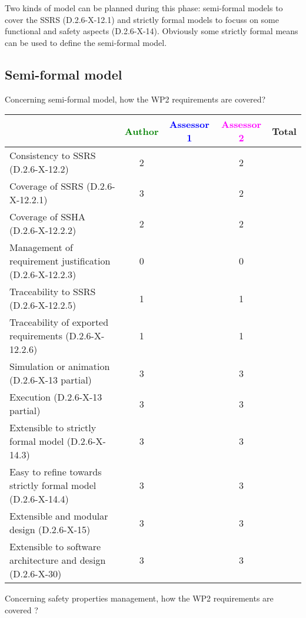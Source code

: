 Two kinds of model can be planned during this phase: semi-formal models to  cover the SSRS (D.2.6-X-12.1) and strictly formal  models to  focuss on some functional and safety aspects (D.2.6-X-14).  Obviously some strictly  formal means can be used to define the semi-formal  model.

\subsection{Semi-formal model}

Concerning semi-formal model, how the WP2 requirements are covered?

\begin{tabular}{|l | c | c | c | c|}
\hline
& \textcolor{green}{Author} & \textcolor{blue}{Assessor 1} & \textcolor{magenta}{Assessor 2} & Total \\
\hline 
Consistency to SSRS (D.2.6-X-12.2) & 2 & & 2 &  \\
\hline
Coverage of SSRS (D.2.6-X-12.2.1)  & 3 & & 2 &  \\
\hline
Coverage of SSHA (D.2.6-X-12.2.2)  & 2 & & 2 &  \\
\hline
Management of requirement justification (D.2.6-X-12.2.3)  & 0 & & 0 &  \\
\hline
Traceability to  SSRS (D.2.6-X-12.2.5)  & 1 & & 1 &  \\
\hline
Traceability of exported requirements (D.2.6-X-12.2.6)  & 1 & & 1 &  \\
\hline
Simulation or animation (D.2.6-X-13 partial)  & 3 & & 3 &  \\
\hline
Execution (D.2.6-X-13 partial)  & 3 & & 3 &  \\
\hline
Extensible to strictly formal model (D.2.6-X-14.3) & 3 & & 3 &  \\
\hline
Easy to  refine towards strictly formal model (D.2.6-X-14.4) & 3 & & 3 &  \\
\hline
Extensible and modular design (D.2.6-X-15)  & 3 & & 3 &  \\
\hline
Extensible to software architecture and design (D.2.6-X-30)   & 3 & & 3 &  \\
\hline
\end{tabular}

Concerning safety properties management, how the WP2 requirements are covered ?

